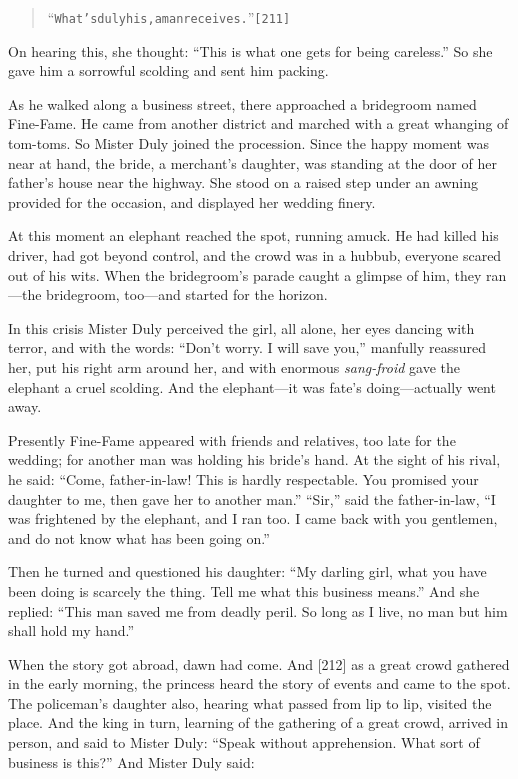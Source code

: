 \documentclass[article, twoside, 14pt]{memoir}
\renewenvironment{verbatim}{%
\begin{quote}%
\vskip -10pt%
\begin{alltt}\normalfont\large}{\end{alltt}%
\end{quote}%
\vskip -10pt
} %
\begin{document}
\begin{verbatim}
“What's duly his, a man receives.”                      [211]
\end{verbatim}
On hearing this, she thought:
``This is what one gets for being careless.'' So she gave him a
sorrowful scolding and sent him packing.

As he walked along a business street, there approached a bridegroom
named Fine-Fame. He came from another district and marched with a
great whanging of tom-toms. So Mister Duly joined the procession.
Since the happy moment was near at hand, the bride, a merchant's
daughter, was standing at the door of her father's house near the
highway. She stood on a raised step under an awning provided for
the occasion, and displayed her wedding finery.

At this moment an elephant reached the spot, running amuck. He had
killed his driver, had got beyond control, and the crowd was in a
hubbub, everyone scared out of his wits. When the bridegroom's
parade caught a glimpse of him, they ran---the bridegroom,
too---and started for the horizon.

In this crisis Mister Duly perceived the girl, all alone, her eyes
dancing with terror, and with the words:
``Don't worry. I will save you,'' manfully reassured her, put his
right arm around her, and with enormous \emph{sang-froid} gave the
elephant a cruel scolding. And the elephant---it was fate's
doing---actually went away.

Presently Fine-Fame appeared with friends and relatives, too late
for the wedding; for another man was holding his bride's hand. At
the sight of his rival, he said:
``Come, father-in-law! This is hardly respectable. You promised your daughter to me, then gave her to another man.''
``Sir,'' said the father-in-law,
``I was frightened by the elephant, and I ran too. I came back with you gentlemen, and do not know what has been going on.''

Then he turned and questioned his daughter:
``My darling girl, what you have been doing is scarcely the thing. Tell me what this business means.''
And she replied:
``This man saved me from deadly peril. So long as I live, no man but him shall hold my hand.''

When the story got abroad, dawn had come. And [212] as a great
crowd gathered in the early morning, the princess heard the story
of events and came to the spot. The policeman's daughter also,
hearing what passed from lip to lip, visited the place. And the
king in turn, learning of the gathering of a great crowd, arrived
in person, and said to Mister Duly:
``Speak without apprehension. What sort of business is this?'' And
Mister Duly said:
\end{document}
